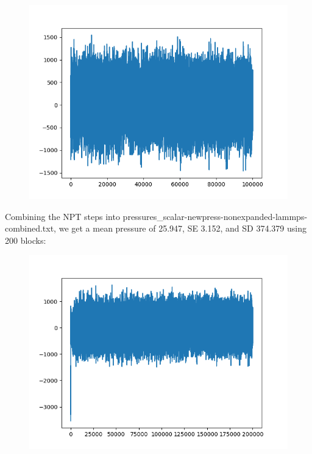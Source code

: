 \documentclass[12pt,reqno]{amsart}
\numberwithin{equation}{section}
\begin{document}
\begin{enumerate}
\begin{figure}[H]
\centering
\includegraphics[scale=0.7]{pressures_newpress-nonexpanded-lammps-restart2}
\end{figure}
Combining the NPT steps into pressures\_scalar-newpress-nonexpanded-lammps-combined.txt, we get a mean pressure of 25.947, SE 3.152, and SD 374.379 using 200 blocks: 
\begin{figure}[H]
\centering
\includegraphics[scale=0.7]{pressures_newpress-nonexpanded-lammps-combined}
\end{figure}
\end{enumerate}
\end{document}
